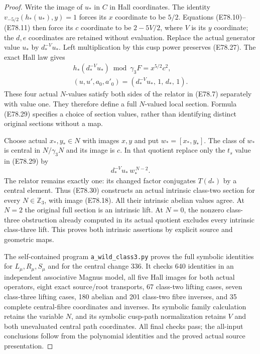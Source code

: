 \begin{proof}
Write the image of $u_*$ in $C$ in Hall coordinates.
The identity
$v_{-5/2}(h_*(u_*),y)=1$ forces its
$x$ coordinate to be $5/2$. Equations
(E78.10)--(E78.11) then force its $c$
coordinate to be $2-5V/2$, where $V$ is
its $y$ coordinate; the $d,e$ coordinates
are retained without evaluation.
Replace the actual generator value $u_*$
by $d_*^{-V}u_*$. Left multiplication by
this cusp power preserves (E78.27).
The exact Hall law gives
\[
 \begin{gathered}
 h_*(d_*^{-V}u_*)\bmod\gamma_3F=x^{5/2}c^2,\\
 (u,u',a_0,a'_0)=(d_*^{-V}u_*,\,1,\,d_*,\,1).
 \end{gathered}
 \tag{E78.29}
\]
These four actual $N$-values satisfy both sides
of the relator in (E78.7) separately with
value one. They therefore define a full
$N$-valued local section. Formula (E78.29)
specifies a choice of section values, rather
than identifying distinct original sections
without a map.

Choose actual $x_*,y_*\in N$ with images $x,y$
and put $w_*=[x_*,y_*]$. The class of $w_*$
is central in $N/\gamma_3N$ and its image
is $c$. In that quotient replace only the
$t_s$ value in (E78.29) by
\[
                 d_*^{-V}u_*\,w_*^{\,N-2}.
 \tag{E78.30}
\]
The relator remains exactly one: its changed
factor conjugates $T(d_*)$ by a central
element. Thus (E78.30) constructs an actual
intrinsic class-two section for every
$N\in\mathbb Z_3$, with image (E78.18).
All their intrinsic abelian values agree.
At $N=2$ the original full section is an
intrinsic lift. At $N=0$, the nonzero
class-three obstruction already computed
in its actual quotient excludes every
intrinsic class-three lift.
This proves both intrinsic assertions by
explicit source and geometric maps.

The self-contained program
\texttt{a\_wild\_class3.py} proves the full
symbolic identities for $L_\mu,R_\mu,S_\mu$
and for the central change $336$. It checks
640 identities in an independent associative
Magnus model, all five Hall images for both
actual operators, eight exact source/root
transports, 67 class-two lifting cases,
seven class-three lifting cases, 180 abelian
and 201 class-two fibre inverses, and 35
complete central-fibre coordinates and
inverses. Its symbolic family calculation
retains the variable $N$, and its symbolic
cusp-path normalization retains $V$ and
both unevaluated central path coordinates.
All final checks
pass; the all-input conclusions follow
from the polynomial identities and the
proved actual source presentation.
\end{proof}
